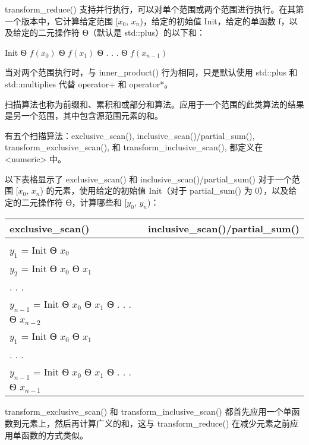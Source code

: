 transform\_reduce() 支持并行执行，可以对单个范围或两个范围进行执行。在其第一个版本中，它计算给定范围 [$x_0$, $x_n$)，给定的初始值 Init，给定的单函数 f，以及给定的二元操作符 Ѳ（默认是 std::plus）的以下和：

Init Ѳ $f(x_0)$ Ѳ $f(x_1)$ Ѳ . . . Ѳ $f(x_{n−1})$

当对两个范围执行时，与 inner\_product() 行为相同，只是默认使用 std::plus 和 std::multiplies 代替 operator+ 和 operator*。


扫描算法也称为前缀和、累积和或部分和算法。应用于一个范围的此类算法的结果是另一个范围，其中包含源范围元素的和。

有五个扫描算法：exclusive\_scan(), inclusive\_scan()/partial\_sum(), transform\_exclusive\_scan(), 和 transform\_inclusive\_scan(), 都定义在 <numeric> 中。

以下表格显示了 exclusive\_scan() 和 inclusive\_scan()/partial\_sum() 对于一个范围 [$x_0$, $x_n$) 的元素，使用给定的初始值 Init（对于 partial\_sum() 为 0），以及给定的二元操作符 Ѳ，计算哪些和 [$y_0$, $y_n$)：

\begin{longtable}{|l|l|}
\hline
\textbf{exclusive\_scan()} &
\textbf{inclusive\_scan()/partial\_sum()} \\ \hline
\endfirsthead
%
\endhead
%
\begin{tabular}[c]{@{}l@{}}$y_0$ = Init\\ $y_1$ = Init Ѳ $x_0$\\ $y_2$ = Init Ѳ $x_0$ Ѳ $x_1$\\ . . .\\ $y_{n-1}$ = Init Ѳ $x_0$ Ѳ $x_1$ Ѳ . . . Ѳ $x_{n-2}$\end{tabular} &
\begin{tabular}[c]{@{}l@{}}$y_0$ = Init Ѳ $x_0$\\ $y_1$ = Init Ѳ $x_0$ Ѳ $x_1$\\ . . .\\ $y_{n-1}$ = Init Ѳ $x_0$ Ѳ $x_1$ Ѳ . . . Ѳ $x_{n-1}$\end{tabular} \\ \hline
\end{longtable}

transform\_exclusive\_scan() 和 transform\_inclusive\_scan() 都首先应用一个单函数到元素上，然后再计算广义的和，这与 transform\_reduce() 在减少元素之前应用单函数的方式类似。

